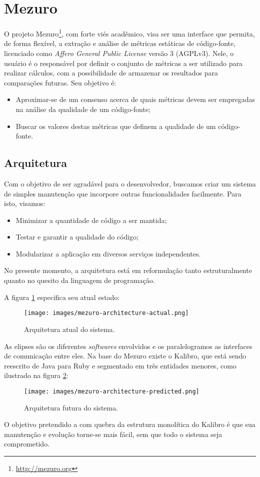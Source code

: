\documentclass[12pt]{article}
\begin{document}
\section{Mezuro}
O projeto Mezuro\footnote{\url{http://mezuro.org}}, com forte viés acadêmico, visa ser uma interface que permita, de forma flexível, a extração e análise de métricas estáticas de código-fonte, licenciado como \textit{Affero General Public License} versão 3 (AGPLv3). Nele, o usuário é o responsável por definir o conjunto de métricas a ser utilizado para realizar cálculos, com a possibilidade de armazenar os resultados para comparações futuras. Seu objetivo é:
\begin{itemize}
    \item Aproximar-se de um consenso acerca de quais métricas devem ser empregadas na análise da qualidade de um código-fonte;
    \item Buscar os valores destas métricas que definem a qualidade de um código-fonte.
\end{itemize}

  \subsection{Arquitetura}
  Com o objetivo de ser agradável para o desenvolvedor, buscamos criar um sistema de simples manutenção que incorpore outras funcionalidades facilmente. Para isto, visamos:
  \begin{itemize}
    \item Minimizar a quantidade de código a ser mantida;
    \item Testar e garantir a qualidade do código;
    \item Modularizar a aplicação em diversos serviços independentes.
  \end{itemize}

  No presente momento, a arquitetura está em reformulação tanto estruturalmente quanto no quesito da linguagem de programação.

  A figura \ref{fig:architecture-1} especifica seu atual estado:
  \begin{figure}[H]
    \centering
    \texttt{[image: images/mezuro-architecture-actual.png]}
    \caption{Arquitetura atual do sistema.}
    \label{fig:architecture-1}
  \end{figure}
  As elipses são os diferentes \textit{softwares} envolvidos e os paralelogramos as interfaces de comunicação entre eles. Na base do Mezuro existe o Kalibro, que está sendo reescrito
  de Java para Ruby e segmentado em três entidades menores, como ilustrado na figura \ref{fig:architecture-2}:
  \begin{figure}[H]
    \centering
      \texttt{[image: images/mezuro-architecture-predicted.png]}
    \caption{Arquitetura futura do sistema.}
    \label{fig:architecture-2}
  \end{figure}
  O objetivo pretendido a com quebra da estrutura monolítica do Kalibro é que sua manutenção e evolução torne-se mais fácil, sem que todo o sistema seja comprometido.
\end{document}
